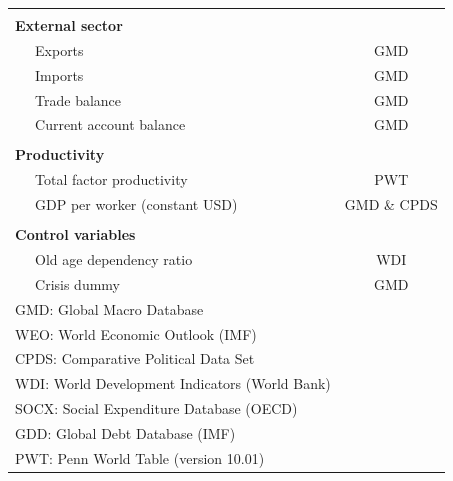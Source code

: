 \documentclass[11pt,english,a4paper, twoside, authoryear]{article}
\begin{document}
\begin{table}[h]
\begin{small}
\begin{tabular}{p{0.2cm} p{10cm} c}
& \\[-0.25cm]
\multicolumn{2}{l}{\textbf{External sector}} & \\
&Exports  &  GMD\\
&Imports  &  GMD \\
&Trade balance  &  GMD \\
&Current account balance &  GMD\\

& \\[-0.25cm]
\multicolumn{2}{l}{\textbf{Productivity}} \\
&Total factor productivity &  PWT \\
&GDP per worker (constant USD) & GMD \& CPDS  \\

& \\[-0.25cm]
\multicolumn{2}{l}{\textbf{Control variables}} \\
&Old age dependency ratio & WDI  \\
&Crisis dummy & GMD   \\

\hline 
\multicolumn{2}{l}{\footnotesize GMD: Global Macro Database \citep{GMD2025}}\\
\multicolumn{2}{l}{\footnotesize WEO: World Economic Outlook (IMF) }\\
\multicolumn{2}{l}{\footnotesize CPDS: Comparative Political Data Set \citep{armingeon2025data}}\\
\multicolumn{2}{l}{\footnotesize WDI: World Development Indicators (World Bank)}\\
\multicolumn{2}{l}{\footnotesize SOCX: Social Expenditure Database (OECD)}\\
\multicolumn{2}{l}{\footnotesize GDD: Global Debt Database (IMF)}\\
\multicolumn{2}{l}{\footnotesize PWT: Penn World Table (version 10.01) \citep{feenstra2015next}}\\
    \end{tabular}
 \end{small}   
\end{table}


\end{document}
